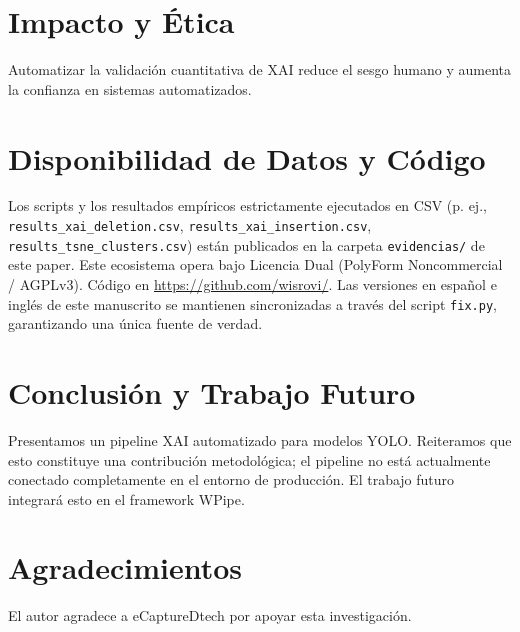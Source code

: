 \documentclass[conference]{IEEEtran}
\begin{document}
\section{Impacto y Ética}
Automatizar la validación cuantitativa de XAI reduce el sesgo humano y aumenta la confianza en sistemas automatizados.

\section{Disponibilidad de Datos y Código}
Los scripts y los resultados empíricos estrictamente ejecutados en CSV (p. ej., \texttt{results\_xai\_deletion.csv}, \texttt{results\_xai\_insertion.csv}, \texttt{results\_tsne\_clusters.csv}) están publicados en la carpeta \texttt{evidencias/} de este paper. Este ecosistema opera bajo Licencia Dual (PolyForm Noncommercial / AGPLv3). Código en \url{https://github.com/wisrovi/}. Las versiones en español e inglés de este manuscrito se mantienen sincronizadas a través del script \texttt{fix.py}, garantizando una única fuente de verdad.

\section{Conclusión y Trabajo Futuro}
Presentamos un pipeline XAI automatizado para modelos YOLO. Reiteramos que esto constituye una contribución metodológica; el pipeline no está actualmente conectado completamente en el entorno de producción. El trabajo futuro integrará esto en el framework WPipe.

\section*{Agradecimientos}
El autor agradece a eCaptureDtech por apoyar esta investigación.



\end{document}
